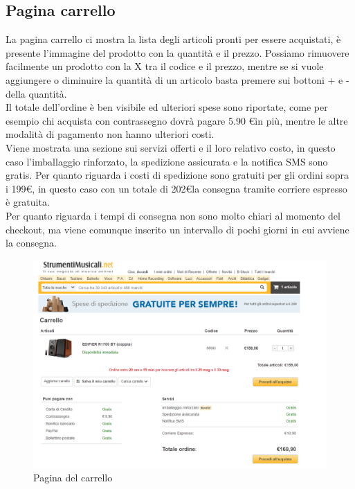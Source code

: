 \documentclass[12pt]{article}
\begin{document}
	\subsection{Pagina carrello}
	\vspace{0.4cm}
	La pagina carrello ci mostra la lista degli articoli pronti per essere acquistati, è presente l'immagine del prodotto con la quantità e il prezzo. Possiamo rimuovere facilmente un prodotto con la X tra il codice e il prezzo, mentre se si vuole aggiungere o diminuire la quantità di un articolo basta premere sui bottoni + e - della quantità.
	\\ Il totale dell'ordine è ben visibile ed ulteriori spese sono riportate, come per esempio chi acquista con contrassegno dovrà pagare 5.90 \euro in più, mentre le altre modalità di pagamento non hanno ulteriori costi. \\Viene mostrata una sezione sui servizi offerti e il loro relativo costo, in questo caso l'imballaggio rinforzato, la spedizione assicurata e la notifica SMS sono gratis. Per quanto riguarda i costi di spedizione sono gratuiti per gli ordini sopra i 199\euro, in questo caso con un totale di 202\euro la consegna tramite corriere espresso è gratuita. 
	\\ Per quanto riguarda i tempi di consegna non sono molto chiari al momento del checkout, ma viene comunque inserito un intervallo di pochi giorni in cui avviene la consegna.
	\begin{figure}
		\centering	
		\includegraphics[width=180mm]{images/carrello.png}
		\caption{Pagina del carrello}
	\end{figure}
	\newpage
\end{document}
